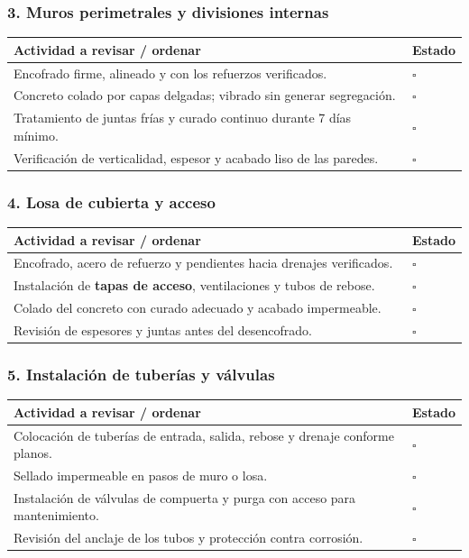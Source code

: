 \documentclass[12pt]{article}
\newcommand{\cbox}{\(\square\)} %
\begin{document}
	\subsubsection*{3. Muros perimetrales y divisiones internas}
	\begin{tabularx}{\linewidth}{>{\raggedright\arraybackslash}p{0.93\linewidth} >{\centering\arraybackslash}m{0.07\linewidth}}
		\toprule
		\textbf{Actividad a revisar / ordenar} & \textbf{Estado}\\
		\midrule
		Encofrado firme, alineado y con los refuerzos verificados. & \cbox \\
		Concreto colado por capas delgadas; vibrado sin generar segregación. & \cbox \\
		Tratamiento de juntas frías y curado continuo durante 7 días mínimo. & \cbox \\
		Verificación de verticalidad, espesor y acabado liso de las paredes. & \cbox \\
		\bottomrule
	\end{tabularx}
	
	\subsubsection*{4. Losa de cubierta y acceso}
	\begin{tabularx}{\linewidth}{>{\raggedright\arraybackslash}p{0.93\linewidth} >{\centering\arraybackslash}m{0.07\linewidth}}
		\toprule
		\textbf{Actividad a revisar / ordenar} & \textbf{Estado}\\
		\midrule
		Encofrado, acero de refuerzo y pendientes hacia drenajes verificados. & \cbox \\
		Instalación de \textbf{tapas de acceso}, ventilaciones y tubos de rebose. & \cbox \\
		Colado del concreto con curado adecuado y acabado impermeable. & \cbox \\
		Revisión de espesores y juntas antes del desencofrado. & \cbox \\
		\bottomrule
	\end{tabularx}
	
	\subsubsection*{5. Instalación de tuberías y válvulas}
	\begin{tabularx}{\linewidth}{>{\raggedright\arraybackslash}p{0.93\linewidth} >{\centering\arraybackslash}m{0.07\linewidth}}
		\toprule
		\textbf{Actividad a revisar / ordenar} & \textbf{Estado}\\
		\midrule
		Colocación de tuberías de entrada, salida, rebose y drenaje conforme planos. & \cbox \\
		Sellado impermeable en pasos de muro o losa. & \cbox \\
		Instalación de válvulas de compuerta y purga con acceso para mantenimiento. & \cbox \\
		Revisión del anclaje de los tubos y protección contra corrosión. & \cbox \\
		\bottomrule
	\end{tabularx}
	
\end{document}
